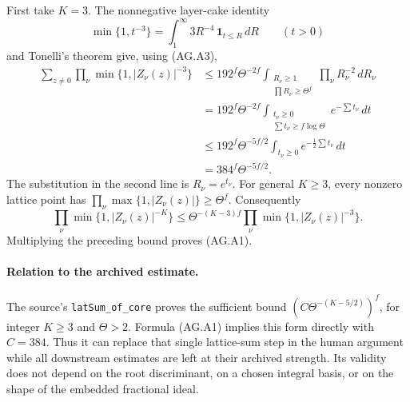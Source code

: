\documentclass[11pt,a4paper]{article}
\numberwithin{equation}{section}
\theoremstyle{remark}\newtheorem{remark}[theorem]{Remark}
\begin{document}
First take \(K=3\).  The nonnegative layer-cake identity
\[
 \min\{1,t^{-3}\}=\int_1^\infty 3R^{-4}\,
                                      \mathbf1_{t\le R}\,dR
 \qquad(t>0)
\]
and Tonelli's theorem give, using (AG.A3),
\begin{align*}
 \sum_{z\ne0}\prod_\nu\min\{1,|Z_\nu(z)|^{-3}\}
 &\le 192^f\Theta^{-2f}
 \int_{\substack{R_\nu\ge1\\\prod R_\nu\ge\Theta^f}}
                         \prod_\nu R_\nu^{-2}\,dR_\nu\\
 &=192^f\Theta^{-2f}
 \int_{\substack{t_\nu\ge0\\\sum t_\nu\ge f\log\Theta}}
                            e^{-\sum t_\nu}\,dt\\
 &\le192^f\Theta^{-5f/2}
       \int_{t_\nu\ge0}e^{-\frac12\sum t_\nu}\,dt\\
 &=384^f\Theta^{-5f/2}.
\end{align*}
The substitution in the second line is \(R_\nu=e^{t_\nu}\).
For general \(K\ge3\), every nonzero lattice point has
\(\prod_\nu\max\{1,|Z_\nu(z)|\}\ge\Theta^f\).  Consequently
\[
 \prod_\nu\min\{1,|Z_\nu(z)|^{-K}\}
 \le \Theta^{-(K-3)f}
                   \prod_\nu\min\{1,|Z_\nu(z)|^{-3}\}.
\]
Multiplying the preceding bound proves (AG.A1).

\paragraph{Relation to the archived estimate.}
The source's \texttt{latSum\_of\_core} proves the sufficient
bound \((C\Theta^{-(K-5/2)})^f\), for integer \(K\ge3\)
and \(\Theta>2\).  Formula (AG.A1) implies this form directly
with \(C=384\).  Thus it can replace that single lattice-sum
step in the human argument while all downstream estimates are
left at their archived strength.  Its validity does not depend
on the root discriminant, on a chosen integral basis, or on the
shape of the embedded fractional ideal.
\end{document}
